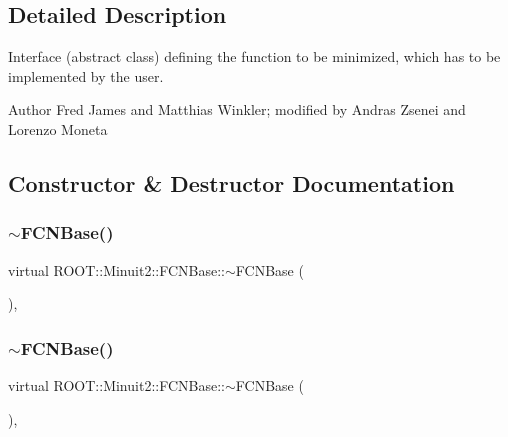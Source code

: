 \subsection{Detailed Description}
Interface (abstract class) defining the function to be minimized, which has to be implemented by the user.

\begin{DoxyAuthor}{Author}
Fred James and Matthias Winkler; modified by Andras Zsenei and Lorenzo Moneta 
\end{DoxyAuthor}


\subsection{Constructor \& Destructor Documentation}
\mbox{\label{classROOT_1_1Minuit2_1_1FCNBase_a2b80638970a23652d21c5f840c3979fa}} 
\subsubsection{\texorpdfstring{$\sim$FCNBase()}{~FCNBase()}\hspace{0.1cm}{\footnotesize\ttfamily [1/3]}}
{\footnotesize\ttfamily virtual R\+O\+O\+T\+::\+Minuit2\+::\+F\+C\+N\+Base\+::$\sim$\+F\+C\+N\+Base (\begin{DoxyParamCaption}{ }\end{DoxyParamCaption})\hspace{0.3cm}{\ttfamily [inline]}, {\ttfamily [virtual]}}

\mbox{\label{classROOT_1_1Minuit2_1_1FCNBase_a2b80638970a23652d21c5f840c3979fa}} 
\subsubsection{\texorpdfstring{$\sim$FCNBase()}{~FCNBase()}\hspace{0.1cm}{\footnotesize\ttfamily [2/3]}}
{\footnotesize\ttfamily virtual R\+O\+O\+T\+::\+Minuit2\+::\+F\+C\+N\+Base\+::$\sim$\+F\+C\+N\+Base (\begin{DoxyParamCaption}{ }\end{DoxyParamCaption})\hspace{0.3cm}{\ttfamily [inline]}, {\ttfamily [virtual]}}

